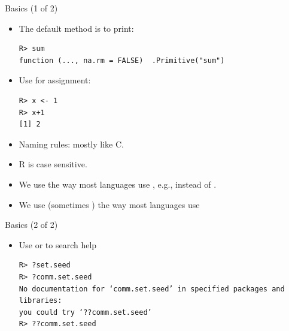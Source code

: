 \begin{frame}[fragile]
  \begin{block}{Basics (1 of 2)}\pause
  \begin{itemize}[<+-|alert@+>]
    \item The default method is to print:
    \vspace{-.4cm}
    
\begin{lstlisting}[backgroundcolor=\color{white},basicstyle=\ttfamily\color{
dkgray}\scriptsize,keywordstyle=\color{black}, 
  commentstyle=\color{orange},stringstyle=\color{mauve}]
R> sum
function (..., na.rm = FALSE)  .Primitive("sum")
    \end{lstlisting} 
    \item Use \code{<-} for assignment:    \vspace{-.4cm}
    
\begin{lstlisting}[backgroundcolor=\color{white},basicstyle=\ttfamily\color{
dkgray}\scriptsize,keywordstyle=\color{black}, 
  commentstyle=\color{orange},stringstyle=\color{mauve}]
R> x <- 1
R> x+1
[1] 2
    \end{lstlisting}
    \item Naming rules:  mostly like C.
    \item R is case sensitive.
    \item We use  the way most languages use \code{_}, e.g., 
 instead of .
    \item We use \code{\$} (sometimes ) the way most languages use 
  \end{itemize}
\end{block}
\end{frame}

\begin{frame}[fragile]
  \begin{block}{Basics (2 of 2)}\pause
  \begin{itemize}[<+-|alert@+>]
    \item Use  or  to search help
    \vspace{-.4cm}
    
\begin{lstlisting}[backgroundcolor=\color{white},basicstyle=\ttfamily\color{
dkgray}\scriptsize,keywordstyle=\color{black}, 
  commentstyle=\color{orange},stringstyle=\color{mauve}]
R> ?set.seed
R> ?comm.set.seed
No documentation for ‘comm.set.seed’ in specified packages and libraries:
you could try ‘??comm.set.seed’
R> ??comm.set.seed
    \end{lstlisting}
  \end{itemize}
\end{block}
\end{frame}


